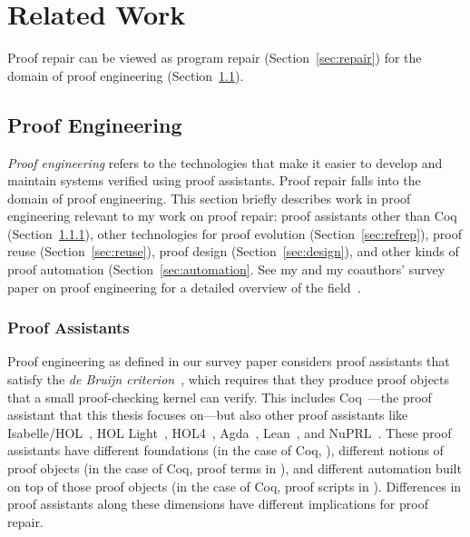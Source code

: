\chapter{Related Work}
\label{sec:related}


Proof repair can be viewed as program repair (Section~\ref{sec:repair})
for the domain of proof engineering (Section~\ref{sec:proofeng}).

\section{Proof Engineering}
\label{sec:proofeng}

\textit{Proof engineering} refers to the technologies that make it easier to develop and maintain
systems verified using proof assistants.
Proof repair falls into the domain of proof engineering.
This section briefly describes work in proof engineering relevant to my work on proof repair:
proof assistants other than Coq (Section~\ref{sec:ass}),
other technologies for proof evolution (Section~\ref{sec:refrep}),
proof reuse (Section~\ref{sec:reuse}),
proof design (Section~\ref{sec:design}),
and other kinds of proof automation (Section~\ref{sec:automation}.
See my and my coauthors' survey paper on proof engineering for a detailed overview of the field~\cite{PGL-045}. %

\subsection{Proof Assistants}
\label{sec:ass}

Proof engineering as defined in our survey paper considers proof assistants that satisfy the \textit{de Bruijn criterion}~\cite{Barendregt2002,Barendregt2351}, which requires that they produce proof objects that a small proof-checking kernel can verify.
This includes Coq~\cite{coq}---the proof assistant that this thesis focuses on---but also other proof assistants like
Isabelle/HOL~\cite{isabelle}, HOL Light~\cite{hollight}, HOL4~\cite{hol4-interact}, Agda~\cite{agda}, Lean~\cite{lean}, and NuPRL~\cite{nuprl}.
These proof assistants have different foundations (in the case of Coq, ),
different notions of proof objects (in the case of Coq, proof terms in ),
and different automation built on top of those proof objects (in the case of Coq, proof scripts in ).
Differences in proof assistants along these dimensions have different implications for proof repair.

